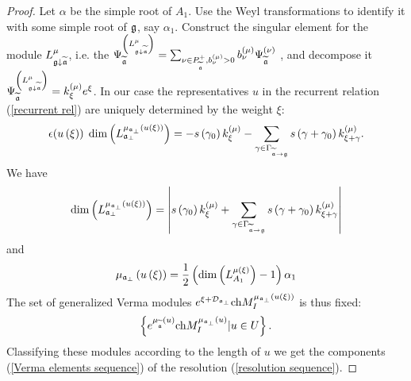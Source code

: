 \documentclass[12pt]{article}
\theoremstyle{definition}
\begin{document}
\begin{proof}
Let $\alpha $ be the simple root of $A_{1}$. Use the Weyl transformations
to identify it with some simple root of $\frak{g}$, say $\alpha _{1}$.
Construct the singular element for the module $L_{\frak{g}\downarrow
\widetilde{\frak{a}}}^{\mu }$, i.e. the $\Psi _{\widetilde{\frak{a}}%
}^{\left( L_{\frak{g}\downarrow \widetilde{\frak{a}}}^{\mu }\right)
}=\sum_{\nu \in P_{\widetilde{\frak{a}}}^{+},b_{\nu }^{\left( \mu \right)
}>0}b_{\nu }^{\left( \mu \right) }\Psi _{\widetilde{\frak{a}}}^{\left( \nu
\right) }$ , and decompose it $\Psi _{\widetilde{\frak{a}}}^{\left( L_{\frak{%
g}\downarrow \widetilde{\frak{a}}}^{\mu }\right) }=k_{\xi }^{\left( \mu
\right) }e^{\xi }$. In our case the representatives $u$ in the
recurrent relation (\ref{recurrent rel}) are uniquely determined by the weight $\xi $:
\begin{equation*}
\epsilon (u\left( \xi \right) )\;\dim \left( L_{\frak{a}_{\perp }}^{\mu _{%
\frak{a}_{\perp }}\left( u\left( \xi \right) \right) }\right) =-s\left(
\gamma _{0}\right) k_{\xi }^{\left( \mu \right) }-\sum_{\gamma \in \Gamma _{%
\widetilde{\frak{a}}\rightarrow \frak{g}}}s\left( \gamma +\gamma _{0}\right)
k_{\xi +\gamma }^{\left( \mu \right) }.
\end{equation*}
We have
\begin{equation*}
\dim \left( L_{\frak{a}_{\perp }}^{\mu _{\frak{a}_{\perp }}\left( u\left(
\xi \right) \right) }\right) =\left| s\left( \gamma _{0}\right) k_{\xi
}^{\left( \mu \right) }+\sum_{\gamma \in \Gamma _{\widetilde{\frak{a}}%
\rightarrow \frak{g}}}s\left( \gamma +\gamma _{0}\right) k_{\xi +\gamma
}^{\left( \mu \right) }\right|
\end{equation*}
and
\begin{equation*}
\mu _{\frak{a}_{\perp }}\left( u\left( \xi \right) \right) =\frac{1}{2}%
\left( \dim \left( L_{A_{1}}^{\mu \left( \xi \right) }\right) -1\right)
\alpha _{1}
\end{equation*}
The set of generalized Verma modules $e^{\xi +\mathcal{D}%
_{\frak{a}_{\perp }}}\mathrm{ch}M_{I}^{\mu _{\frak{a}_{\perp }}\left(
u\left( \xi \right) \right) }$ is thus fixed:
\begin{equation*}
\left\{ e^{\mu _{\widetilde{\mathfrak{a}}}\left( u\right) }\mathrm{ch}%
M_{I}^{\mu _{\frak{a}_{\perp }}\left( u\right) }|u\in U\right\} .
\end{equation*}
Classifying these modules according to the length of $u$
we get the components (\ref{Verma elements sequence}) of the resolution (\ref{resolution sequence}).
\end{proof}
\end{document}
